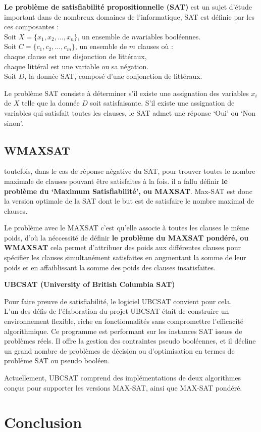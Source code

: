 \textbf{Le problème de satisfiabilité propositionnelle (SAT)} est un sujet d'étude important dans de nombreux domaines de l'informatique, SAT est définie par les ces composantes :\\
\hspace{2em}Soit $X=\{x_1, x_2,\dots, x_n\}$, un ensemble de $n$variables booléennes.\\
\hspace{2em}Soit $C=\{c_1, c_2,\dots, c_m\}$, un ensemble de $m$ clauses où :\\
\hspace{2em}chaque clause est une disjonction de littéraux,\\
\hspace{2em}chaque littéral est une variable ou sa négation.\\
\hspace{2em}Soit $D$, la donnée SAT, composé d'une conjonction de littéraux.

Le problème SAT consiste à déterminer s’il existe une assignation des variables $x_i$ de $X$ telle que la donnée $D$ soit satisfaisante. S’il existe une assignation de variables qui satisfait toutes les clauses, le SAT admet une réponse ‘Oui’ ou ‘Non sinon’. 
\subsection{WMAXSAT}

toutefois, dans le cas de réponse négative du SAT, pour trouver toutes le nombre maximale de clauses pouvant être satisfaites à la fois. il a fallu définir \textbf{le problème du ‘Maximum Satisfiabilité’, ou MAXSAT}. Max-SAT est donc la version optimale de la SAT dont le but est de satisfaire le nombre maximal de clauses.

Le problème avec le MAXSAT c’est qu’elle associe à toutes les clauses le même poids, d’où la néccessité de définir \textbf{le problème du MAXSAT pondéré, ou WMAXSAT} cela permet d'attribuer des poids aux différentes clauses pour spécifier les clauses simultanément satisfaites en augmentant la somme de leur poids et en affaiblissant la somme des poids des clauses insatisfaites.


\textbf{UBCSAT (University of British Columbia SAT)}

Pour faire preuve de satisfiabilité, le logiciel UBCSAT convient pour cela.\\
L'un des défis de l'élaboration du projet UBCSAT était de construire un environnement flexible, riche en fonctionnalités sans compromettre l'efficacité algorithmique. Ce programme est performant sur les instances SAT issues de problèmes réels. Il offre la gestion des contraintes pseudo booléennes, et il décline un grand nombre de problèmes de décision ou d’optimisation en termes de problème SAT ou pseudo booléen.    

Actuellement, UBCSAT comprend des implémentations de deux algorithmes conçus pour supporter les versions MAX-SAT, ainsi que MAX-SAT pondéré.

{}
\section*{Conclusion}
